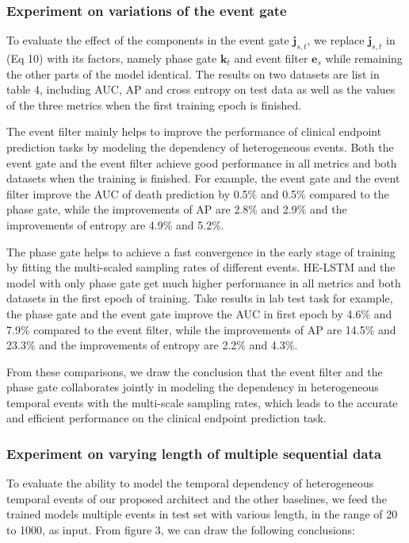 \documentclass[letterpaper]{article} %
\begin{document}
\subsubsection{Experiment on variations of the event gate}
To evaluate the effect of the components in the event gate $\bm j_{s,t}$, we replace  $\bm j_{s,t}$ in (Eq 10) with its factors, namely phase gate $\bm k_t$ and event filter $\bm e_s$ while remaining the other parts of the model identical.
The results on two datasets are list in table 4, including AUC, AP and cross entropy on test data as well as the values of the three metrics when the first training epoch is finished.

The event filter mainly helps to improve the performance of clinical endpoint prediction tasks by modeling the dependency of heterogeneous events. Both the event gate and the event filter achieve good performance in all metrics and both datasets when the training is finished.
For example, the event gate and the event filter improve the AUC of death prediction by 0.5\% and 0.5\% compared to the phase gate, while the improvements of AP are 2.8\% and 2.9\% and the improvements of entropy are 4.9\% and 5.2\%.

The phase gate helps to achieve a fast convergence in the early stage of training by fitting the multi-scaled sampling rates of different events. HE-LSTM and the model with only phase gate get much higher performance in all metrics and both datasets in the first epoch of training.
Take results in lab test task for example, the phase gate and the event gate improve the AUC in first epoch by 4.6\% and 7.9\% compared to the event filter, while the improvements of AP are 14.5\% and 23.3\% and the improvements of entropy are 2.2\% and 4.3\%.

From these comparisons, we draw the conclusion that the event filter and the phase gate collaborates jointly in modeling the dependency in heterogeneous temporal events with the multi-scale sampling rates, which leads to the accurate and efficient performance on the clinical endpoint prediction task.





\subsubsection{Experiment on varying length of multiple sequential data}

To evaluate the ability to model the temporal dependency of heterogeneous temporal events of our proposed architect and the other baselines, we feed the trained models multiple events in test set with various length, in the range of 20 to 1000, as input. From figure 3, we can draw the following conclusions:
\end{document}
